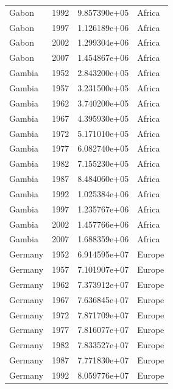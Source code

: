 \documentclass[
  letterpaper,
  DIV=11,
  numbers=noendperiod]{scrreprt}
\begin{document}
\begin{tcolorbox}
\begin{tabular}{lrrl}
Gabon                    &  1992 &  9.857390e+05 &    Africa \\
Gabon                    &  1997 &  1.126189e+06 &    Africa \\
Gabon                    &  2002 &  1.299304e+06 &    Africa \\
Gabon                    &  2007 &  1.454867e+06 &    Africa \\
Gambia                   &  1952 &  2.843200e+05 &    Africa \\
Gambia                   &  1957 &  3.231500e+05 &    Africa \\
Gambia                   &  1962 &  3.740200e+05 &    Africa \\
Gambia                   &  1967 &  4.395930e+05 &    Africa \\
Gambia                   &  1972 &  5.171010e+05 &    Africa \\
Gambia                   &  1977 &  6.082740e+05 &    Africa \\
Gambia                   &  1982 &  7.155230e+05 &    Africa \\
Gambia                   &  1987 &  8.484060e+05 &    Africa \\
Gambia                   &  1992 &  1.025384e+06 &    Africa \\
Gambia                   &  1997 &  1.235767e+06 &    Africa \\
Gambia                   &  2002 &  1.457766e+06 &    Africa \\
Gambia                   &  2007 &  1.688359e+06 &    Africa \\
Germany                  &  1952 &  6.914595e+07 &    Europe \\
Germany                  &  1957 &  7.101907e+07 &    Europe \\
Germany                  &  1962 &  7.373912e+07 &    Europe \\
Germany                  &  1967 &  7.636845e+07 &    Europe \\
Germany                  &  1972 &  7.871709e+07 &    Europe \\
Germany                  &  1977 &  7.816077e+07 &    Europe \\
Germany                  &  1982 &  7.833527e+07 &    Europe \\
Germany                  &  1987 &  7.771830e+07 &    Europe \\
Germany                  &  1992 &  8.059776e+07 &    Europe \\

\end{tabular}
\end{tcolorbox}
\end{document}
